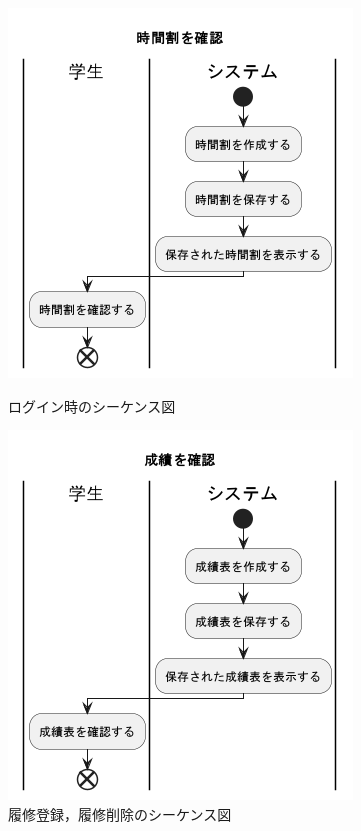 \documentclass[documentclass]{jsarticle}
\begin{document}
\begin{figure}[H]
  \centering
  \begin{minipage}[b]{0.49\columnwidth}
      \centering
      \includegraphics[width=0.9\columnwidth]{figure/7-3.png}
      \caption{ログイン時のシーケンス図}
      \label{fig:7-3}
  \end{minipage}
  \begin{minipage}[b]{0.49\columnwidth}
      \centering
      \includegraphics[width=0.9\columnwidth]{figure/7-4.png}
      \caption{履修登録，履修削除のシーケンス図}
      \label{fig:7-4}
  \end{minipage}
\end{figure}
\end{document}
